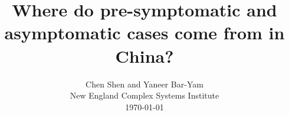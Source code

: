 \documentclass[onecolumn,journal]{IEEEtran}
\begin{document}
\title{\color{Brown} Where do pre-symptomatic and asymptomatic cases come from in China? \\
\vspace{-0.35ex}}
\author{Chen Shen and Yaneer Bar-Yam \\ New England Complex Systems Institute \\
 \today 
  \vspace{-14ex} \\ 

   
\bigskip
\bigskip

\textbf{}
 }
    
\maketitle


\flushbottom %



\thispagestyle{empty} %




\renewcommand{\thefootnote}{\fnsymbol{footnote}}
\end{document}
